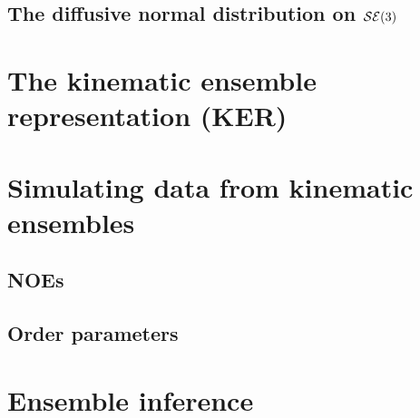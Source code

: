 \documentclass[../main.tex]{subfiles}
\begin{document}
\begin{refsection}
\subsection{\texorpdfstring{The diffusive normal distribution on $\mathcal{SE}(3)$}{The diffusive normal distribution on \textbackslash SE\{3\}}}\label{the-diffusive-normal-distribution-on-se3}

\section{The kinematic ensemble representation (KER)}\label{the-kinematic-ensemble-representation-ker}

\section{Simulating data from kinematic ensembles}\label{simulating-data-from-kinematic-ensembles}

\subsection{NOEs}\label{noes}

\subsection{Order parameters}\label{order-parameters}

\section{Ensemble inference}

\printbibliography[heading=subbibintoc]
\end{refsection}
\end{document}
